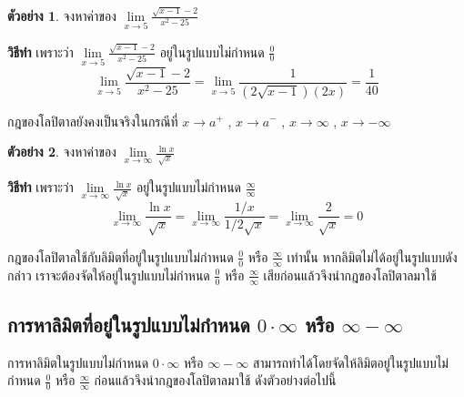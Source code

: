 \documentclass[
]{book}
\theoremstyle{definition}
\theoremstyle{definition}
\newtheorem{example}{ตัวอย่าง}[chapter]
\theoremstyle{definition}
\theoremstyle{definition}
\theoremstyle{remark}
\begin{document}
\begin{example}
จงหาค่าของ \(\displaystyle \mathop {\lim }\limits_{x\to 5} \frac{\sqrt
{x-1}
-2}{x^2-25}\)
\end{example}

\textbf{วิธีทำ} เพราะว่า
\(\displaystyle \mathop {\lim }\limits_{x\to 5} \frac{\sqrt
{x-1}
-2}{x^2-25}\) อยู่ในรูปแบบไม่กำหนด \(\displaystyle \frac{0}{0}\)
\[\displaystyle \mathop {\lim }\limits_{x\to 5} \frac{\sqrt {x-1} 
-2}{x^2-25}=\mathop {\lim 
}\limits_{x\to 5} \frac{1}{(2\sqrt {x-1} )(2x)}=\frac{1}{40}\]

กฎของโลปิตาลยังคงเป็นจริงในกรณีที่ \(x\to a^+\) , \(x\to a^-\) , \(x\to \infty\) ,
\(x\to -\infty\)

\begin{example}
จงหาค่าของ
\(\displaystyle \mathop {\lim }\limits_{x\to \infty } \frac{\ln
x}{\sqrt x }\)
\end{example}

\textbf{วิธีทำ} เพราะว่า
\(\displaystyle \mathop {\lim }\limits_{x\to \infty } \frac{\ln
x}{\sqrt x
}\) อยู่ในรูปแบบไม่กำหนด \(\displaystyle \frac{\infty }{\infty }\)
\[\displaystyle \mathop {\lim }\limits_{x\to \infty } \frac{\ln x}{\sqrt x 
}=\mathop {\lim 
}\limits_{x\to \infty } \frac{1/x}{1/2\sqrt x }=\mathop {\lim }\limits_{x\to 
\infty } \frac{2}{\sqrt x }=0\]

กฎของโลปิตาลใช้กับลิมิตที่อยู่ในรูปแบบไม่กำหนด \(\displaystyle \frac{0}{0}\) หรือ
\(\displaystyle \frac{\infty }{\infty }\) เท่านั้น หากลิมิตไม่ได้อยู่ในรูปแบบดังกล่าว
เราจะต้องจัดให้อยู่ในรูปแบบไม่กำหนด \(\displaystyle \frac{0}{0}\) หรือ
\(\displaystyle \frac{\infty
}{\infty }\) เสียก่อนแล้วจึงนำกฎของโลปิตาลมาใช้

\subsection{\texorpdfstring{การหาลิมิตที่อยู่ในรูปแบบไม่กำหนด \(0\cdot \infty\) หรือ \(\infty
-\infty\)}{การหาลิมิตที่อยู่ในรูปแบบไม่กำหนด 0\textbackslash cdot \textbackslash infty หรือ \textbackslash infty
-\textbackslash infty}}\label{uxe01uxe32uxe23uxe2buxe32uxe25uxe21uxe15uxe17uxe2duxe22uxe43uxe19uxe23uxe1buxe41uxe1auxe1auxe44uxe21uxe01uxe33uxe2buxe19uxe14-0cdot-infty-uxe2buxe23uxe2d-infty--infty}

การหาลิมิตในรูปแบบไม่กำหนด \(0\cdot \infty\) หรือ \(\infty -\infty\)
สามารถทำได้โดยจัดให้ลิมิตอยู่ในรูปแบบไม่กำหนด \(\displaystyle \frac{0}{0}\) หรือ
\(\displaystyle \frac{\infty }{\infty }\) ก่อนแล้วจึงนำกฎของโลปิตาลมาใช้
ดังตัวอย่างต่อไปนี้
\end{document}
